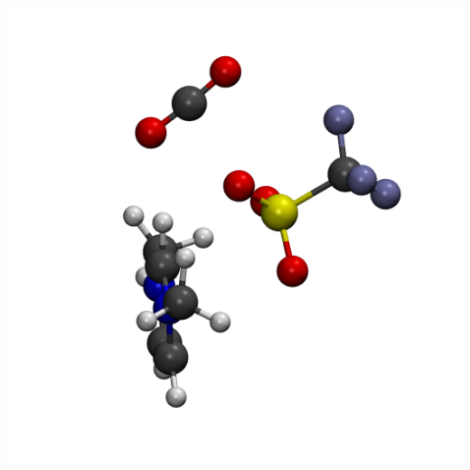 \documentclass{beamer}
\begin{document}
\begin{frame}
  \includegraphics[scale=0.09]{./figures/cluster_TfO.png}
\end{frame}
\end{document}
